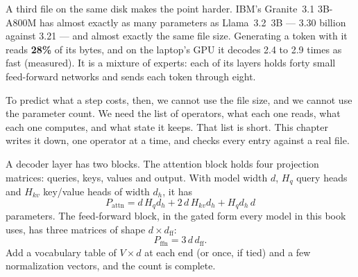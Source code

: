 A third file on the same disk makes the point harder. IBM's Granite~3.1
3B-A800M has almost exactly as many parameters as Llama~3.2~3B --- 3.30
billion against 3.21 --- and almost exactly the same file size. Generating a
token with it reads \textbf{28\%} of its bytes, and on the laptop's GPU it
decodes 2.4 to 2.9 times as fast (measured). It is a mixture of experts: each
of its layers holds forty small feed-forward networks and sends each token
through eight.

To predict what a step costs, then, we cannot use the file size, and we cannot
use the parameter count. We need the list of operators, what each one reads,
what each one computes, and what state it keeps. That list is short. This
chapter writes it down, one operator at a time, and checks every entry against
a real file.



A decoder layer has two blocks. The attention block holds four projection
matrices: queries, keys, values and output. With model width $d$, $H_q$ query
heads and $H_{kv}$ key/value heads of width $d_h$, it has
\begin{equation}
P_{\text{attn}} = d\,H_qd_h + 2\,d\,H_{kv}d_h + H_qd_h\,d
\label{eq:params-attn}
\end{equation}
parameters. The feed-forward block, in the gated form every model in this
book uses, has three matrices of shape $d\times d_{\mathrm{ff}}$:
\begin{equation}
P_{\text{ffn}} = 3\,d\,d_{\mathrm{ff}}.
\label{eq:params-ffn}
\end{equation}
Add a vocabulary table of $V\times d$ at each end (or once, if tied) and a few
normalization vectors, and the count is complete.

